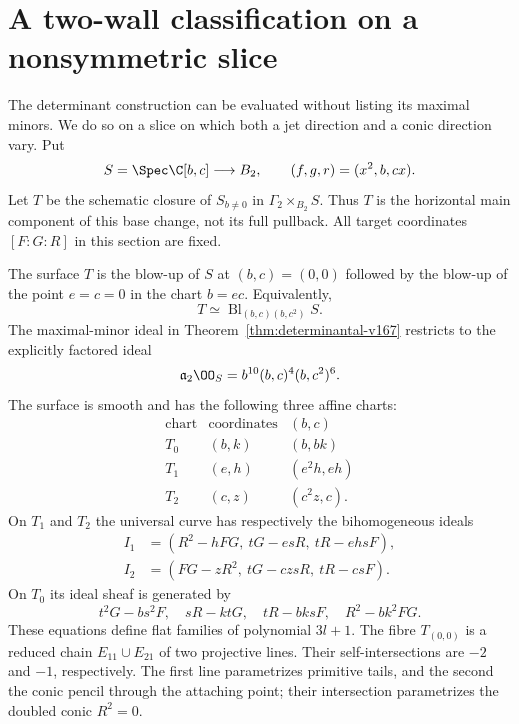 \section{A two-wall classification on a nonsymmetric slice}
\label{sec:two-wall-v167}
The determinant construction can be evaluated without listing its
maximal minors. We do so on a slice on which both a jet direction
and a conic direction vary. Put
\[
 S=\Spec\C[b,c]\longrightarrow B_2,\qquad
                  (f,g,r)=(x^2,b,cx).
\]
Let $T$ be the schematic closure of $S_{b\ne0}$ in
$\Gamma_2\times_{B_2}S$. Thus $T$ is the horizontal main component
of this base change, not its full pullback. All target coordinates
$[F:G:R]$ in this section are fixed.

\begin{theorem}\label{thm:two-wall-v167}
The surface $T$ is the blow-up of $S$ at $(b,c)=(0,0)$ followed
by the blow-up of the point $e=c=0$ in the chart $b=ec$.
Equivalently,
\[
                   T\simeq\operatorname{Bl}_{(b,c)(b,c^2)}S.
\]
The maximal-minor ideal in Theorem~\ref{thm:determinantal-v167}
restricts to the explicitly factored ideal
\begin{equation}\label{eq:slice-minors-v167}
          \mathfrak a_2\OO_S=b^{10}(b,c)^4(b,c^2)^6.
\end{equation}
The surface is smooth and has the following three affine charts:
\begin{equation}\label{eq:three-charts-v167}
 \begin{array}{c|c|c}
 \text{chart}&\text{coordinates}&(b,c)\\ \hline
 T_0&(b,k)&(b,bk)\\
 T_1&(e,h)&(e^2h,eh)\\
 T_2&(c,z)&(c^2z,c).
 \end{array}
\end{equation}
On $T_1$ and $T_2$ the universal curve has respectively the
bihomogeneous ideals
\begin{align}
 I_1&=(R^2-hFG,\ tG-esR,\ tR-ehsF),\label{eq:slice-I1-v167}\\
 I_2&=(FG-zR^2,\ tG-czsR,\ tR-csF).\label{eq:slice-I2-v167}
\end{align}
On $T_0$ its ideal sheaf is generated by
\begin{equation}\label{eq:slice-I0-v167}
 t^2G-bs^2F,\quad sR-ktG,\quad tR-bksF,\quad
                         R^2-bk^2FG.
\end{equation}
These equations define flat families of polynomial $3l+1$.
The fibre $T_{(0,0)}$ is a reduced chain $E_{11}\cup E_{21}$
of two projective lines. Their self-intersections are $-2$ and
$-1$, respectively. The first line parametrizes primitive tails,
and the second the conic pencil through the attaching point;
their intersection parametrizes the doubled conic $R^2=0$.
\end{theorem}

